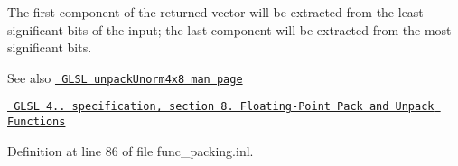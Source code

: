 The first component of the returned vector will be extracted from the least significant bits of the input; the last component will be extracted from the most significant bits.

\begin{DoxySeeAlso}{See also}
\href{http://www.opengl.org/sdk/docs/manglsl/xhtml/unpackUnorm4x8.xml}{\texttt{ G\+L\+SL unpack\+Unorm4x8 man page}} 

\href{http://www.opengl.org/registry/doc/GLSLangSpec.4.20.8.pdf}{\texttt{ G\+L\+SL 4.. specification, section 8. Floating-\/\+Point Pack and Unpack Functions}} 
\end{DoxySeeAlso}


Definition at line 86 of file func\+\_\+packing.\+inl.

